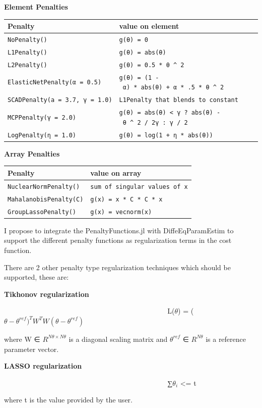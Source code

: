 \documentclass[11pt]{article}
\begin{document}
    \textbf{Element Penalties}

\begin{longtable}[c]{@{}ll@{}}
\toprule
Penalty & value on element\tabularnewline
\midrule
\endhead
\texttt{NoPenalty()} & \texttt{g(θ)\ =\ 0}\tabularnewline
\texttt{L1Penalty()} & \texttt{g(θ)\ =\ abs(θ)}\tabularnewline
\texttt{L2Penalty()} &
\texttt{g(θ)\ =\ 0.5\ *\ θ\ \^{}\ 2}\tabularnewline
\texttt{ElasticNetPenalty(α\ =\ 0.5)} &
\texttt{g(θ)\ =\ (1\ -\ α)\ *\ abs(θ)\ +\ α\ *\ .5\ *\ θ\ \^{}\ 2}\tabularnewline
\texttt{SCADPenalty(a\ =\ 3.7,\ γ\ =\ 1.0)} &
\texttt{L1Penalty\ that\ blends\ to\ constant}\tabularnewline
\texttt{MCPPenalty(γ\ =\ 2.0)} &
\texttt{g(θ)\ =\ abs(θ)\ \textless{}\ γ\ ?\ abs(θ)\ -\ θ\ \^{}\ 2\ /\ 2γ\ :\ γ\ /\ 2}\tabularnewline
\texttt{LogPenalty(η\ =\ 1.0)} &
\texttt{g(θ)\ =\ log(1\ +\ η\ *\ abs(θ))}\tabularnewline
\bottomrule
\end{longtable}

    \textbf{Array Penalties}

\begin{longtable}[c]{@{}ll@{}}
\toprule
Penalty & value on array\tabularnewline
\midrule
\endhead
\texttt{NuclearNormPenalty()} &
\texttt{sum\ of\ singular\ values\ of\ x}\tabularnewline
\texttt{MahalanobisPenalty(C)} &
\texttt{g(x)\ =\ x\textquotesingle{}\ *\ C\textquotesingle{}\ *\ C\ *\ x}\tabularnewline
\texttt{GroupLassoPenalty()} &
\texttt{g(x)\ =\ vecnorm(x)}\tabularnewline
\bottomrule
\end{longtable}

    I propose to integrate the PenaltyFunctions.jl with DiffeEqParamEstim to
support the different penalty functions as regularization terms in the
cost function.

There are 2 other penalty type regularization techniques which should be
supported, these are:

\textbf{Tikhonov regularization}

~~~~~~~~~~ ~~~~~~~~~~~~~~~~~~~~~~~~~~~~~~~~~~~ L(\(\theta\)) =
(\(\theta - \theta^{ref})^{T} W^{T}W(\theta - \theta^{ref})\)

where W ∈ \(R^{N\theta×N\theta}\) is a diagonal scaling matrix and
\(\theta^{ref}\) ∈ \(R^{N\theta}\) is a reference parameter vector.

    \textbf{LASSO regularization}

~~~~~~~~~~ ~~~~~~~~~~~~~~~~~~~~~~~~~~~~~~~~~~~ ∑\(\theta_{i}\)
\textless{}= t

where t is the value provided by the user.
\end{document}
